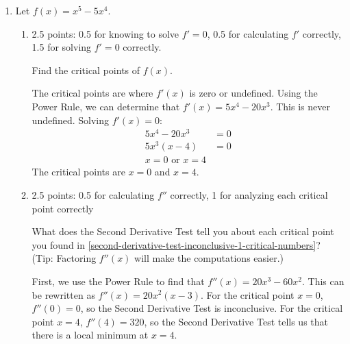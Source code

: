 \documentclass{article}
\begin{document}
\begin{enumerate}
\item \label{second-derivative-test-inconclusive-1}


  Let $f(x) = x^5 - 5x^4$. 
  \begin{enumerate}
  \item \label{second-derivative-test-inconclusive-1-critical-numbers}

    \begin{grading}
      2.5 points: 0.5 for knowing to solve $f' = 0$, 0.5 for calculating $f'$ correctly, 1.5 for solving $f' = 0$ correctly.
    \end{grading}

    \begin{problem}[\stretch{0.5}]
      Find the critical points of $f(x)$.
    \end{problem}

    \begin{solution}
      The critical points are where $f'(x)$ is zero or undefined. Using the Power Rule,
      we can determine that $f'(x)=5x^4-20x^3$. This is never undefined. Solving
      $f'(x)=0$:
      \begin{align*}
        5x^4-20x^3 &= 0 \\
        5x^3(x-4) &= 0 \\
        x=0 \text{ or } x=4
      \end{align*}
      The critical points are $x=0$ and $x=4$.
    \end{solution}

  \item

    \begin{grading}
      2.5 points: 0.5 for calculating $f''$ correctly, 1 for analyzing each critical point correctly
    \end{grading}

    \begin{problem}[\vfill]
      What does the Second Derivative Test tell you about each critical point you found in \ref{second-derivative-test-inconclusive-1-critical-numbers}? (Tip: Factoring $f''(x)$ will make the computations easier.) 
    \end{problem}

    \begin{solution}
      First, we use the Power Rule to find that $f''(x)=20x^3-60x^2$. This can be rewritten
      as $f''(x)=20x^2(x-3)$. For the critical point $x=0$, $f''(0)=0$, so the Second
      Derivative Test is inconclusive. For the critical point $x=4$, $f''(4)=320$, so
      the Second Derivative Test tells us that there is a local minimum at $x=4$. 
    \end{solution}


\end{enumerate}
\end{enumerate}
\end{document}
